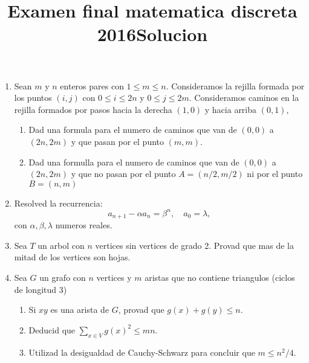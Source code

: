 \documentclass{article}
\begin{document}
\title{Examen final matematica discreta 2016}
\date {}
\maketitle

\begin{enumerate}
\item Sean $m$ y $n$ enteros pares con $1 \leq m \leq n$. Consideramos la rejilla formada por los
puntos $(i, j)$ con $0 \leq i \leq 2n$ y $0 \leq j \leq 2m$. Consideramos caminos en la rejilla
formados por pasos hacia la derecha $(1,0)$ y hacia arriba $(0,1)$,
\begin{enumerate}
\item Dad una formula para el numero de caminos que van de $(0,0)$ a $(2n,2m)$ y que pasan
por el punto $(m,m)$.
\item Dad una formulla para el numero de caminos que van de $(0,0)$ a $(2n,2m)$ y que no pasan
por el punto $A = (n/2,m/2)$ ni por el punto $B = (n, m)$
\end{enumerate}

\item Resolved la recurrencia:
\[
a_{n+1} - \alpha a_n = \beta^n, \quad a_0 = \lambda,
\]
con $\alpha,\beta, \lambda$ numeros reales.

\item Sea $T$ un arbol con $n$ vertices sin vertices de grado 2. Provad que mas de la mitad de los
vertices son hojas.

\item Sea $G$ un grafo con $n$ vertices y $m$ aristas que no contiene triangulos (ciclos de longitud
3)
\begin{enumerate}
\item Si $xy$ es una arista de $G$, provad que $g(x) + g(y) \leq n$.
\item Deducid que \( \sum_{x \in V} g(x)^2 \leq mn \).
\item Utilizad la desigualdad de Cauchy-Schwarz para concluir que $m \leq n^2/4$. \newline
[$\left( \sum_{i=1}^n a_ib_i \right)^2 \leq \left( \sum_{i=1}^n a_i^2 \right)
\left( \sum_{i=1}^n b_i^2 \right), a_i, b_i \in \mathbb{R}.$]
\end{enumerate}
\end{enumerate}

\newpage
\title{Solucion}
\date{}
\maketitle
\end{document}

